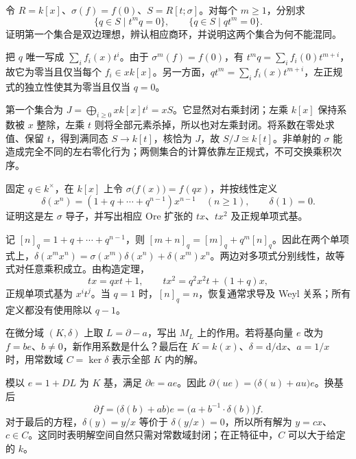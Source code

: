 \begin{optionalexercise}\label{b2:ex:20-ore-noninjective-sidedness}
	令 \(R=k[x]\)、\(\sigma(f)=f(0)\)、\(S=R[t;\sigma]\)。对每个 \(m\ge1\)，分别求
	\[
		\{q\in S\mid t^mq=0\},\qquad \{q\in S\mid qt^m=0\}.
	\]
	证明第一个集合是双边理想，辨认相应商环，并说明这两个集合为何不能混同。
\end{optionalexercise}
\begin{solution}
	把 \(q\) 唯一写成 \(\sum_i f_i(x)t^i\)。由于 \(\sigma^m(f)=f(0)\)，有 \(t^mq=\sum_i f_i(0)t^{m+i}\)，故它为零当且仅当每个 \(f_i\in xk[x]\)。另一方面，\(qt^m=\sum_i f_i(x)t^{m+i}\)，左正规式的独立性使其为零当且仅当 \(q=0\)。

	第一个集合为 \(J=\bigoplus_{i\ge0}xk[x]t^i=xS\)。它显然对右乘封闭；左乘 \(k[x]\) 保持系数被 \(x\) 整除，左乘 \(t\) 则将全部元素杀掉，所以也对左乘封闭。将系数在零处求值、保留 \(t\)，得到满同态 \(S\to k[t]\)，核恰为 \(J\)，故 \(S/J\cong k[t]\)。非单射的 \(\sigma\) 能造成完全不同的左右零化行为；两侧集合的计算依靠左正规式，不可交换乘积次序。
\end{solution}

\begin{optionalexercise}\label{b2:ex:20-q-derivation}
	固定 \(q\in k^\times\)，在 \(k[x]\) 上令 \(\sigma\bigl(f(x)\bigr)=f(qx)\)，并按线性定义
	\[
		\delta(x^n)=(1+q+\cdots+q^{n-1})x^{n-1}\quad(n\ge1), \qquad\delta(1)=0.
	\]
	证明这是左 \(\sigma\) 导子，并写出相应 Ore 扩张的 \(tx\)、\(tx^2\) 及正规单项式基。
\end{optionalexercise}
\begin{solution}
	记 \([n]_q=1+q+\cdots+q^{n-1}\)，则 \([m+n]_q=[m]_q+q^m[n]_q\)。因此在两个单项式上，\(\delta(x^mx^n)=\sigma(x^m)\delta(x^n)+\delta(x^m)x^n\)。两边对多项式分别线性，故等式对任意乘积成立。由构造定理，
	\[
		tx=qxt+1,\qquad tx^2=q^2x^2t+(1+q)x,
	\]
	正规单项式基为 \(x^it^j\)。当 \(q=1\) 时，\([n]_q=n\)，恢复通常求导及 Weyl 关系；所有定义都没有使用除以 \(q-1\)。
\end{solution}

\begin{optionalexercise}\label{b2:ex:20-differential-line}
	在微分域 \((K,\delta)\) 上取 \(L=\partial-a\)，写出 \(M_L\) 上的作用。若将基向量 \(e\) 改为 \(f=be\)、\(b\ne0\)，新作用系数是什么？最后在 \(K=k(x)\)、\(\delta=\mathrm{d}/\mathrm{d}x\)、\(a=1/x\) 时，用常数域 \(C=\ker\delta\) 表示全部 \(K\) 内的解。
\end{optionalexercise}
\begin{solution}
	模以 \(e=1+DL\) 为 \(K\) 基，满足 \(\partial e=ae\)。因此 \(\partial(ue)=\bigl(\delta(u)+au\bigr)e\)。换基后
	\[
		\partial f=\bigl(\delta(b)+ab\bigr)e =\bigl(a+b^{-1}\cdot\delta(b)\bigr)f.
	\]
	对于最后的方程，\(\delta(y)=y/x\) 等价于 \(\delta(y/x)=0\)，所以所有解为 \(y=cx\)、\(c\in C\)。这同时表明解空间自然只需对常数域封闭；在正特征中，\(C\) 可以大于给定的 \(k\)。
\end{solution}

